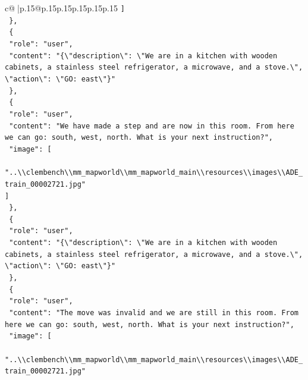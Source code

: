 \documentclass{article}
\begin{document}
{\begin{supertabular}{c@{$\;$}|p{.15\linewidth}@{}p{.15\linewidth}p{.15\linewidth}p{.15\linewidth}p{.15\linewidth}p{.15\linewidth}}
{{{\texttt{    {]}} \\
\texttt{  \},} \\
\texttt{  \{} \\
\texttt{    "role": "user",} \\
\texttt{    "content": "\{\textbackslash{}"description\textbackslash{}": \textbackslash{}"We are in a kitchen with wooden cabinets, a stainless steel refrigerator, a microwave, and a stove.\textbackslash{}", \textbackslash{}"action\textbackslash{}": \textbackslash{}"GO: east\textbackslash{}"\}"} \\
\texttt{  \},} \\
\texttt{  \{} \\
\texttt{    "role": "user",} \\
\texttt{    "content": "We have made a step and are now in this room. From here we can go: south, west, north. What is your next instruction?",} \\
\texttt{    "image": {[}} \\
\texttt{      "..\textbackslash{}\textbackslash{}clembench\textbackslash{}\textbackslash{}mm\_mapworld\textbackslash{}\textbackslash{}mm\_mapworld\_main\textbackslash{}\textbackslash{}resources\textbackslash{}\textbackslash{}images\textbackslash{}\textbackslash{}ADE\_train\_00002721.jpg"} \\
\texttt{    {]}} \\
\texttt{  \},} \\
\texttt{  \{} \\
\texttt{    "role": "user",} \\
\texttt{    "content": "\{\textbackslash{}"description\textbackslash{}": \textbackslash{}"We are in a kitchen with wooden cabinets, a stainless steel refrigerator, a microwave, and a stove.\textbackslash{}", \textbackslash{}"action\textbackslash{}": \textbackslash{}"GO: east\textbackslash{}"\}"} \\
\texttt{  \},} \\
\texttt{  \{} \\
\texttt{    "role": "user",} \\
\texttt{    "content": "The move was invalid and we are still in this room. From here we can go: south, west, north. What is your next instruction?",} \\
\texttt{    "image": {[}} \\
\texttt{      "..\textbackslash{}\textbackslash{}clembench\textbackslash{}\textbackslash{}mm\_mapworld\textbackslash{}\textbackslash{}mm\_mapworld\_main\textbackslash{}\textbackslash{}resources\textbackslash{}\textbackslash{}images\textbackslash{}\textbackslash{}ADE\_train\_00002721.jpg"} \\
}}}
\end{supertabular}}
\end{document}
